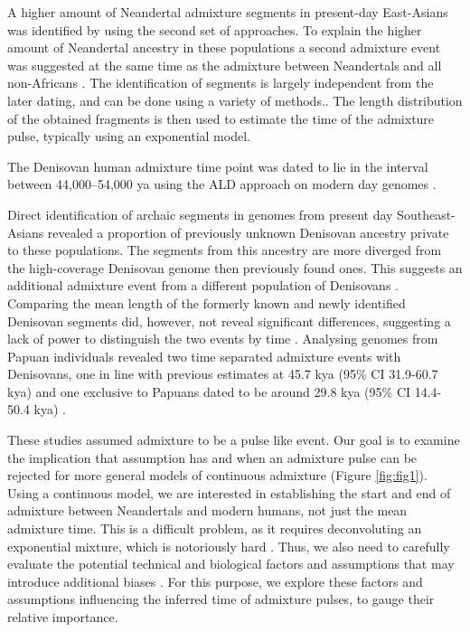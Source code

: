 \documentclass[]{article}
\begin{document}
A higher amount of Neandertal admixture segments in present-day East-Asians was identified by using the second set of approaches. To explain the higher amount of Neandertal ancestry in these populations a second admixture event was suggested at the same time as the admixture between Neandertals and
all non-Africans \citep{kim_selection_2015,vernot_complex_2015}.  The identification of segments is largely independent from the later dating, and can be done using a variety of methods.\citep{racimo_signatures_2017,seguin_orlando_paleogenomics_2014,vernot_excavating_2016,sankararaman_combined_2016,skov_detecting_2018}. The length distribution of the obtained fragments is then used to estimate the time of the admixture pulse, typically using an exponential model.

The Denisovan human
admixture time point was dated to lie in the interval between 44,000--54,000 ya using the ALD
approach on modern day genomes \citep{sankararaman_combined_2016}.

Direct identification of archaic segments in genomes from present day Southeast-Asians revealed a proportion of previously unknown Denisovan ancestry private to these populations. The segments from this ancestry are more diverged from the high-coverage Denisovan genome then previously found ones. This suggests an additional admixture event from a different population of Denisovans \citep{browning_analysis_2018}.
Comparing the mean length of the formerly known and newly identified Denisovan segments did, however, not reveal
significant differences, suggesting a lack of power to distinguish the
two events by time \citep{browning_analysis_2018,jacobs_multiple_2019}.
Analysing genomes from Papuan individuals revealed two time separated
admixture events with Denisovans, one in line with previous estimates at
45.7 kya (95\% CI 31.9-60.7 kya) and one exclusive to Papuans dated to
be around 29.8 kya (95\% CI 14.4-50.4 kya)
\citep{jacobs_multiple_2019}.


These studies assumed admixture to be a pulse like event.
Our goal is to examine the implication that assumption has and when an admixture pulse can be rejected for more general models of continuous admixture (Figure \ref{fig:fig1}).  Using a continuous model, we are interested in establishing the start and end of admixture between Neandertals and modern humans, not just the mean admixture time. This is a difficult problem, as it requires deconvoluting an exponential mixture, which is notoriously hard \citep{dasgupta_mixture_2008}. Thus, we also need to carefully evaluate the potential technical and biological factors and assumptions that may introduce additional biases \citep{pool_inference_2009,gravel_population_2012,liang_lengths_2014}.
For this purpose, we explore these factors and assumptions influencing the inferred time of admixture pulses, to gauge their relative importance.
\end{document}
